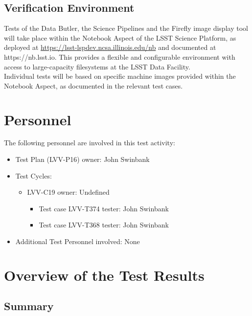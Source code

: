 \documentclass[DM,STR,toc]{lsstdoc}
\begin{document}
\subsection{Verification Environment}
\label{sect:hwconf}
  Tests of the Data Butler, the Science Pipelines and the Firefly image
display tool will take place within the Notebook Aspect of the LSST
Science Platform, as deployed at
\url{https://lsst-lspdev.ncsa.illinois.edu/nb} and documented at
https://nb.lsst.io. This provides a flexible and configurable
environment with access to large-capacity filesystems at the LSST Data
Facility.\\[2\baselineskip]Individual tests will be based on specific
machine images provided within the Notebook Aspect, as documented in the
relevant test cases.~





\section{Personnel}
\label{sect:personnel}

The following personnel are involved in this test activity:

\begin{itemize}
\item Test Plan (LVV-P16) owner: John Swinbank
\item Test Cycles:
\begin{itemize}
  \item LVV-C19 owner: 
    Undefined
  \begin{itemize}
    \item Test case LVV-T374 tester: John Swinbank
    \item Test case LVV-T368 tester: John Swinbank
  \end{itemize}
\end{itemize}
\item Additional Test Personnel involved: None
\end{itemize}

\newpage

\section{Overview of the Test Results}
\label{sect:overview}

\subsection{Summary}
\label{sect:summarytable}
\end{document}
